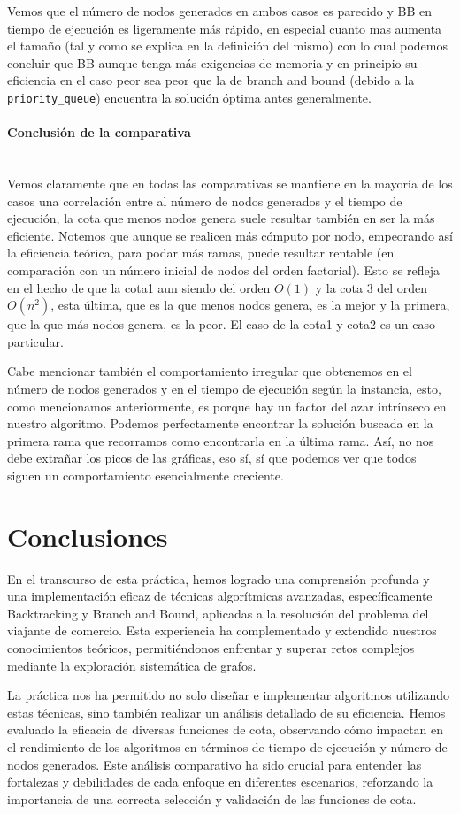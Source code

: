 \documentclass{article}
\newcommand{\myparagraph}[1]{\paragraph{#1}\mbox{}\\}
\begin{document}
Vemos que el número de nodos generados en ambos casos es parecido y BB en tiempo de ejecución es ligeramente más rápido, en especial cuanto mas aumenta el tamaño (tal y como se explica en la definición del mismo) con lo cual podemos concluir que BB aunque tenga más exigencias de memoria y en principio su eficiencia en el caso peor sea peor que la de branch and bound (debido a la \verb|priority_queue|) encuentra la solución óptima antes generalmente.

\myparagraph{Conclusión de la comparativa}

Vemos claramente que en todas las comparativas se mantiene en la mayoría de los casos una correlación entre al número de nodos generados y el tiempo de ejecución, la cota que menos nodos genera suele resultar también en ser la más eficiente. Notemos que aunque se realicen más cómputo por nodo, empeorando así la eficiencia teórica, para podar más ramas, puede resultar rentable (en comparación con un número inicial de nodos del orden factorial). Esto se refleja en el hecho de que la cota1 aun siendo del orden $O(1)$ y la cota 3 del orden $O(n^2)$, esta última, que es la que menos nodos genera, es la mejor y la primera, que la que más nodos genera, es la peor. El caso de la cota1 y cota2 es un caso particular. 

Cabe mencionar también el comportamiento irregular que obtenemos en el número de nodos generados y en el tiempo de ejecución según la instancia, esto, como mencionamos anteriormente, es porque hay un factor del azar intrínseco en nuestro algoritmo. Podemos perfectamente encontrar la solución buscada en la primera rama que recorramos como encontrarla en la última rama. Así, no nos debe extrañar los picos de las gráficas, eso sí, sí que podemos ver que todos siguen un comportamiento esencialmente creciente. 

\newpage
\section{Conclusiones}
En el transcurso de esta práctica, hemos logrado una comprensión profunda y una implementación eficaz de técnicas algorítmicas avanzadas, específicamente Backtracking y Branch and Bound, aplicadas a la resolución del problema del viajante de comercio. Esta experiencia ha complementado y extendido nuestros conocimientos teóricos, permitiéndonos enfrentar y superar retos complejos mediante la exploración sistemática de grafos.

La práctica nos ha permitido no solo diseñar e implementar algoritmos utilizando estas técnicas, sino también realizar un análisis detallado de su eficiencia. Hemos evaluado la eficacia de diversas funciones de cota, observando cómo impactan en el rendimiento de los algoritmos en términos de tiempo de ejecución y número de nodos generados. Este análisis comparativo ha sido crucial para entender las fortalezas y debilidades de cada enfoque en diferentes escenarios, reforzando la importancia de una correcta selección y validación de las funciones de cota.
\end{document}
